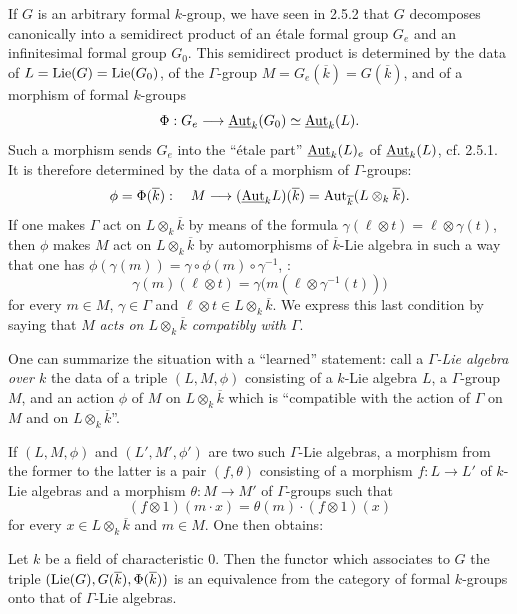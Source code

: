 If $G$ is an arbitrary formal $k$-group, we have seen in 2.5.2 that $G$ decomposes canonically into a semidirect product of an étale formal group $G_e$ and an infinitesimal formal group $G_0$. This semidirect product is determined by the data of $L=\operatorname{Lie}(G)=\operatorname{Lie}(G_0)$, of the $\Gamma$-group $M=G_e(\overline k)=G(\overline k)$, and of a morphism of formal $k$-groups
\[
\Phi:G_e\longrightarrow\underline{\operatorname{Aut}}_k(G_0)\simeq\underline{\operatorname{Aut}}_k(L).
\]
Such a morphism sends $G_e$ into the ``étale part'' $\underline{\operatorname{Aut}}_k(L)_e$ of $\underline{\operatorname{Aut}}_k(L)$, cf. 2.5.1. It is therefore determined by the data of a morphism of $\Gamma$-groups:
\[
\phi=\Phi(\overline k):\quad M\longrightarrow(\underline{\operatorname{Aut}}_k L)(\overline k)=\operatorname{Aut}_{\overline k}(L\otimes_k\overline k).
\]
If one makes $\Gamma$ act on $L\otimes_k\overline k$ by means of the formula $\gamma(\ell\otimes t)=\ell\otimes\gamma(t)$, then $\phi$ makes $M$ act on $L\otimes_k\overline k$ by automorphisms of $\overline k$-Lie algebra in such a way that one has $\phi(\gamma(m))=\gamma\circ\phi(m)\circ\gamma^{-1}$, \ie:
\[
\gamma(m)(\ell\otimes t)=\gamma\bigl(m(\ell\otimes\gamma^{-1}(t))\bigr)
\]
for every $m\in M$, $\gamma\in\Gamma$ and $\ell\otimes t\in L\otimes_k\overline k$. We express this last condition by saying that $M$ \emph{acts on $L\otimes_k\overline k$ compatibly with $\Gamma$}.

One can summarize the situation with a ``learned'' statement: call a \emph{$\Gamma$-Lie algebra over $k$} the data of a triple $(L,M,\phi)$ consisting of a $k$-Lie algebra $L$, a $\Gamma$-group $M$, and an action $\phi$ of $M$ on $L\otimes_k\overline k$ which is ``compatible with the action of $\Gamma$ on $M$ and on $L\otimes_k\overline k$''.

If $(L,M,\phi)$ and $(L',M',\phi')$ are two such $\Gamma$-Lie algebras, a morphism from the former to the latter is a pair $(f,\theta)$ consisting of a morphism $f:L\to L'$ of $k$-Lie algebras and a morphism $\theta:M\to M'$ of $\Gamma$-groups such that
\[
(f\otimes1)(m\cdot x)=\theta(m)\cdot(f\otimes1)(x)
\]
for every $x\in L\otimes_k\overline k$ and $m\in M$. One then obtains:
\begin{theorem}{}
Let $k$ be a field of characteristic $0$. Then the functor which associates to $G$ the triple $(\operatorname{Lie}(G),G(\overline k),\Phi(\overline k))$ is an equivalence from the category of formal $k$-groups onto that of $\Gamma$-Lie algebras.
\end{theorem}

